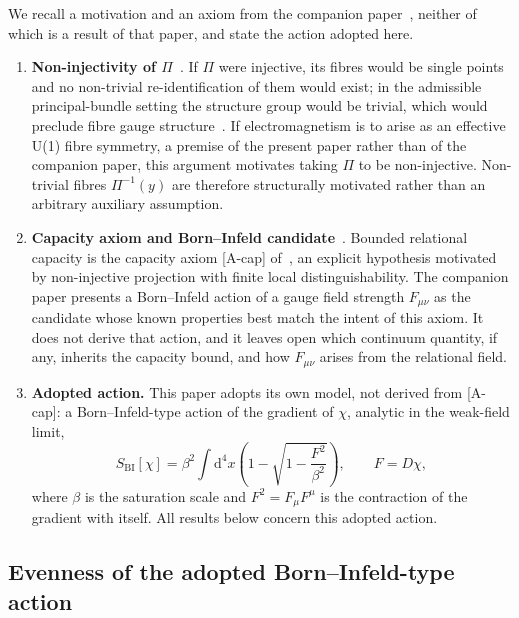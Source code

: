 \documentclass[11pt,a4paper]{article}
\newcommand{\Proj}{\Pi}
\newcommand{\chifield}{\chi}
\begin{document}
    We recall a motivation and an axiom from the companion paper~\cite{Beau2026c}, neither of
    which is a result of that paper, and state the action adopted here.

    \begin{enumerate}
      \item \textbf{Non-injectivity of $\Proj$}~\cite{Beau2026c}.
      If $\Proj$ were injective, its fibres would be single points and no non-trivial
      re-identification of them would exist; in the admissible principal-bundle setting the
      structure group would be trivial, which would preclude fibre gauge structure~\cite{Cosmochrony}.
      If electromagnetism is to arise as an effective U(1) fibre symmetry, a premise of the
      present paper rather than of the companion paper, this argument motivates taking $\Proj$
      to be non-injective.
      Non-trivial fibres $\Proj^{-1}(y)$ are therefore structurally motivated rather than an
      arbitrary auxiliary assumption.

      \item \textbf{Capacity axiom and Born--Infeld candidate}~\cite{Beau2026c}.
      Bounded relational capacity is the capacity axiom [A-cap] of~\cite{Beau2026c},
      an explicit hypothesis motivated by non-injective projection with finite local
      distinguishability.
      The companion paper presents a Born--Infeld action of a gauge field strength $F_{\mu\nu}$
      as the candidate whose known properties best match the intent of this axiom.
      It does not derive that action, and it leaves open which continuum quantity, if any,
      inherits the capacity bound, and how $F_{\mu\nu}$ arises from the relational field.

      \item \textbf{Adopted action.}
      This paper adopts its own model, not derived from [A-cap]: a Born--Infeld-type action of
      the gradient of $\chifield$, analytic in the weak-field limit,
      \begin{equation}
        S_{\mathrm{BI}}[\chifield]
        = \beta^{2} \int \!\mathrm{d}^{4}x
        \left(1 - \sqrt{1 - \frac{F^{2}}{\beta^{2}}}\right),
        \qquad F = D\chifield,
        \label{eq:SBI}
      \end{equation}
      where $\beta$ is the saturation scale and $F^{2} = F_{\mu}F^{\mu}$ is the contraction of
      the gradient with itself.
      All results below concern this adopted action.
    \end{enumerate}

  \subsection{Evenness of the adopted Born--Infeld-type action}
    \label{ssec:parity}
\end{document}
